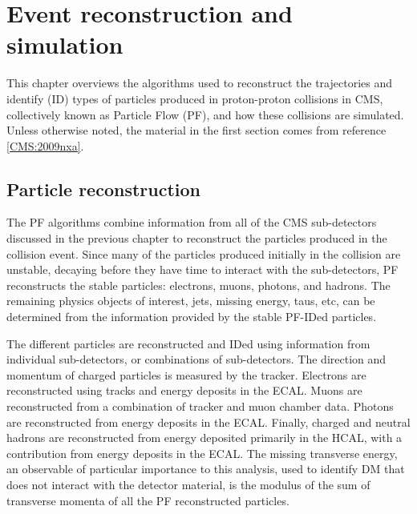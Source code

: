 \chapter{Event reconstruction and simulation}

This chapter overviews the algorithms used to reconstruct the trajectories and identify (ID) types of particles produced in proton-proton collisions in CMS, collectively known as Particle Flow (PF), and how these collisions are simulated. Unless otherwise noted, the material in the first section comes from reference \ref{CMS:2009nxa}.

\section{Particle reconstruction}

The PF algorithms combine information from all of the CMS sub-detectors discussed in the previous chapter to reconstruct the particles produced in the collision event. Since many of the particles produced initially in the collision are unstable, decaying before they have time to interact with the sub-detectors, PF reconstructs the stable particles: electrons, muons, photons, and hadrons. The remaining physics objects of interest, jets, missing energy, taus, etc, can be determined from the information provided by the stable PF-IDed particles. 

\indent The different particles are reconstructed and IDed using information from individual sub-detectors, or combinations of sub-detectors. The direction and momentum of charged particles is measured by the tracker. Electrons are reconstructed using tracks and energy deposits in the ECAL. Muons are reconstructed from a combination of tracker and muon chamber data. Photons are reconstructed from energy deposits in the ECAL. Finally, charged and neutral hadrons are reconstructed from energy deposited primarily in the HCAL, with a contribution from energy deposits in the ECAL. The missing transverse energy, an observable of particular importance to this analysis, used to identify DM that does not interact with the detector material, is the modulus of the sum of transverse momenta of all the PF reconstructed particles. 

